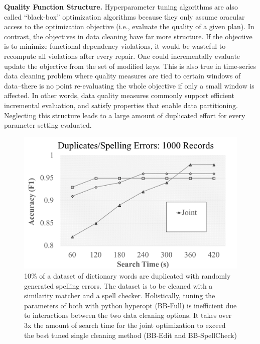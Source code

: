 \vspace{0.5em}
\noindent \textbf{Quality Function Structure. } Hyperparameter tuning algorithms are also called ``black-box'' optimization algorithms because they only assume oracular access to the optimization objective (i.e., evaluate the quality of a given plan). In contrast, the objectives in data cleaning have far more structure. 
If the objective is to minimize functional dependency violations, it would be wasteful to recompute all violations after every repair. One could incrementally evaluate update the objective from the set of modified keys.
This is also true in time-series data cleaning problem where quality measures are tied to certain windows of data--there is no point re-evaluating the whole objective if only a small window is affected.
In other words, data quality measures commonly support efficient incremental evaluation, and satisfy properties that enable data partitioning.  
Neglecting this structure leads to a large amount of duplicated effort for every parameter setting evaluated.

\begin{figure}[t]
\centering
 \includegraphics[width=0.9\columnwidth]{figures/teaser-experiment.png}
 \caption{\small 10\% of a dataset of dictionary words are duplicated with randomly generated spelling errors. The dataset is to be cleaned with a similarity matcher and a spell checker. Holistically, tuning the parameters of both with \textsf{python hyperopt} (BB-Full) is inefficient due to interactions between the two data cleaning options. It takes over 3x the amount of search time for the joint optimization to exceed the best tuned single cleaning method (BB-Edit and BB-SpellCheck) \label{fig:teaser}}
\end{figure}



